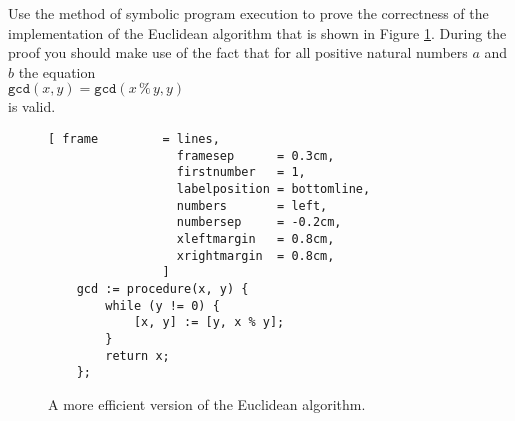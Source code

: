 \exercise
Use the method of symbolic program execution to prove the correctness of the implementation of the
Euclidean algorithm that is shown in Figure \ref{fig:gcd.stlx}.  During the proof you should make
use of the fact that for all positive natural numbers $a$ and $b$ the equation
\\[0.2cm]
\hspace*{1.3cm}
$\mathtt{gcd}(x, y) = \mathtt{gcd}(x \,\texttt{\%}\, y, y)$
\\[0.2cm]
is valid.  

\begin{figure}[!ht]
\centering
\begin{Verbatim}[ frame         = lines, 
                  framesep      = 0.3cm, 
                  firstnumber   = 1,
                  labelposition = bottomline,
                  numbers       = left,
                  numbersep     = -0.2cm,
                  xleftmargin   = 0.8cm,
                  xrightmargin  = 0.8cm,
                ]
    gcd := procedure(x, y) {
        while (y != 0) {
            [x, y] := [y, x % y];
        }
        return x;
    };
\end{Verbatim}
\vspace*{-0.3cm}
\caption{A more efficient version of the Euclidean algorithm.}
\label{fig:gcd.stlx}
\end{figure}


